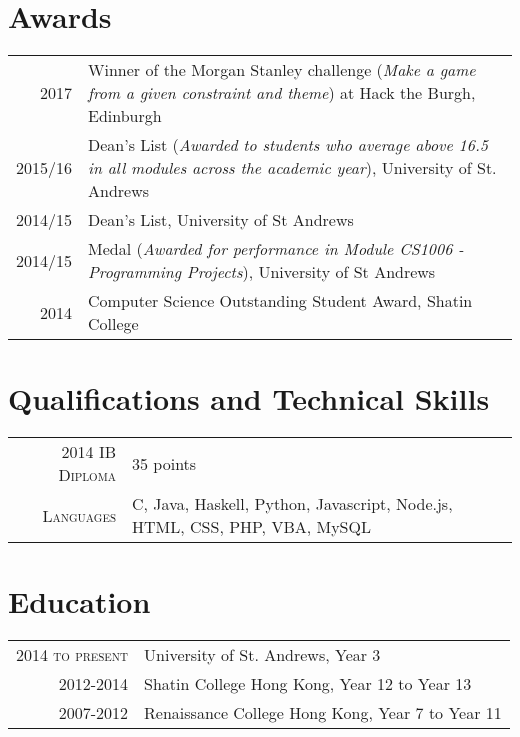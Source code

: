 \documentclass{article}
\begin{document}
\section*{Awards}
\begin{tabular}{r|p{17cm}}
\textsc{2017} & Winner of the Morgan Stanley challenge (\textit{Make a game from a given constraint and theme}) at Hack the Burgh, Edinburgh\\
\textsc{2015/16} & Dean's List (\textit{Awarded to students who average above 16.5 in all modules across the academic year}), University of St. Andrews \\

\textsc{2014/15} & Dean’s List, University of St Andrews\\

\textsc{2014/15} & Medal (\textit{Awarded for performance in Module CS1006 - Programming Projects}), University of St Andrews\\

\textsc{2014} & Computer Science Outstanding Student Award, Shatin College \\
\end{tabular}

\section*{Qualifications and Technical Skills}
\begin{tabular}{r|p{15cm}}
\textsc{2014 IB Diploma} &  35 points\\
\textsc{Languages} & C, Java, Haskell, Python, Javascript, Node.js, HTML, CSS, PHP, VBA, MySQL\\
\end{tabular}

\section*{Education}
\begin{tabular}{r|p{15cm}}
\textsc{2014 to present} & University of St. Andrews, Year 3\\

\textsc{2012-2014} & Shatin College Hong Kong, Year 12 to Year 13\\

\textsc{2007-2012} & Renaissance College Hong Kong, Year 7 to Year 11\\

\end{tabular}
\end{document}
